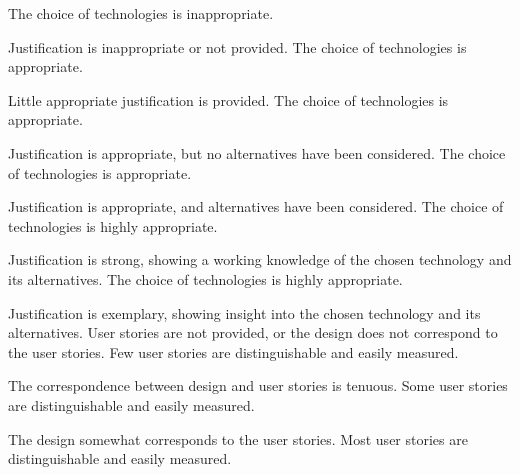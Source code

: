 \documentclass{../fal_assignment}
\begin{document}
\begin{markingrubric}
%
        \grade\fail The choice of technologies is inappropriate.
            \par Justification is inappropriate or not provided.
        \grade The choice of technologies is appropriate.
            \par Little appropriate justification is provided.
        \grade The choice of technologies is appropriate.
            \par Justification is appropriate, but no alternatives have been considered.
        \grade The choice of technologies is appropriate.
            \par Justification is appropriate, and alternatives have been considered.
        \grade The choice of technologies is highly appropriate.
            \par Justification is strong, showing a working knowledge of the chosen technology and its alternatives.
        \grade The choice of technologies is highly appropriate.
            \par Justification is exemplary, showing insight into the chosen technology and its alternatives.
%
        \grade\fail User stories are not provided, or the design does not correspond to the user stories.
        \grade Few user stories are distinguishable and easily measured.
            \par The correspondence between design and user stories is tenuous.
        \grade Some user stories are distinguishable and easily measured.
            \par The design somewhat corresponds to the user stories.
        \grade Most user stories are distinguishable and easily measured.

\end{markingrubric}
\end{document}
